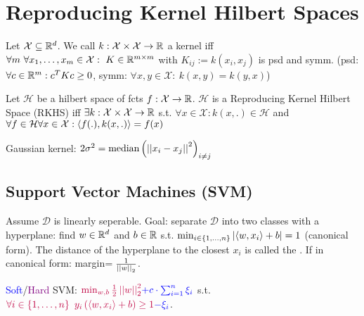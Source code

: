 \section{Reproducing Kernel Hilbert Spaces}

\vspace{-5pt}

 Let $\mathcal{X} \subseteq \mathbb{R}^d$. We call $k: \mathcal{X} \times \mathcal{X} \rightarrow \mathbb{R}$ a kernel iff $\forall m \ \forall x_1,\dots,x_m \in \mathcal{X}: \ K \in \mathbb{R}^{m \times m}$ with $K_{ij} := k(x_i,x_j)$ is psd and symm. (psd: $\forall c \in \mathbb{R}^m: c^T K c \geq 0$, symm: $\forall x,y \in \mathcal{X}: \ k(x,y) = k(y,x)$)

\vspace{5pt}

 Let $\mathcal{H}$ be a hilbert space of fcts $f: \mathcal{X} \rightarrow \mathbb{R}$. $\mathcal{H}$ is a Reproducing Kernel Hilbert Space (RKHS) iff $\exists k : \mathcal{X} \times \mathcal{X} \rightarrow \mathbb{R}$ s.t. $\forall x \in \mathcal{X}: k(x,.) \in \mathcal{H}$ and $\forall f \in \mathcal{H} \forall x \in \mathcal{X}: \left\langle f(.) , k(x,.) \right\rangle = f(x)$

\vspace{5pt}

Gaussian kernel: $2 \sigma^2 = \text{median} \left( \left\vert\left\vert x_i - x_j \right\vert\right\vert^2 \right)_{i \neq j}$

\vspace{-13pt}

\subsection{Support Vector Machines (SVM)}
Assume $\mathcal{D}$ is linearly seperable. Goal: separate $\mathcal{D}$ into two classes with a hyperplane: find $w \in \mathbb{R}^d$ and $b \in \mathbb{R}$ s.t. $\min_{i \in \left\{ 1,\dots,n \right\}} \left\vert \left\langle w , x_i \right\rangle + b \right\vert = 1$ (canonical form). The distance of the hyperplane to the closest $x_i$ is called the . If in canonical form: margin$=\frac{1}{\left\vert\left\vert w \right\vert\right\vert_2}$.

\vspace{5pt}

 \textcolor{blue}{Soft}/\textcolor{purple}{Hard} SVM:
$\textcolor{purple}{\min_{w,b} \frac{1}{2} \left\vert\left\vert w \right\vert\right\vert_2^2} \textcolor{blue}{+ c \cdot \sum_{i=1}^n \xi_i}$ s.t. $\textcolor{purple}{\forall i \in \left\{ 1,\dots,n \right\} \ y_i \left( \left\langle w , x_i \right\rangle + b \right) \geq 1} \textcolor{blue}{-\xi_i}$.
